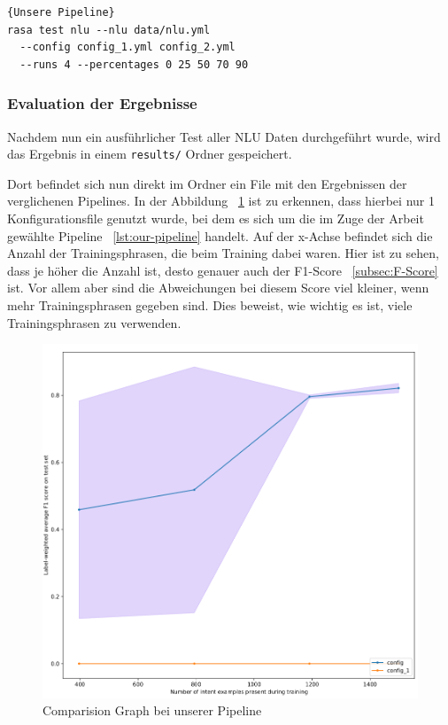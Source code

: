 \begin{lstlisting}[label={lst:comparing-pipelines-custom},caption={Unsere Pipeline}]{Unsere Pipeline}
rasa test nlu --nlu data/nlu.yml
  --config config_1.yml config_2.yml
  --runs 4 --percentages 0 25 50 70 90
\end{lstlisting}

\subsubsection{Evaluation der Ergebnisse}\label{subsubsec:evaluation-results}

Nachdem nun ein ausführlicher Test aller NLU Daten durchgeführt wurde, wird das Ergebnis in einem \texttt{results/} Ordner gespeichert.\cite{interpretingTheOutput}

Dort befindet sich nun direkt im Ordner ein File mit den Ergebnissen der verglichenen Pipelines.
In der Abbildung ~\ref{fig:comparision_graph} ist zu erkennen, dass hierbei nur 1 Konfigurationsfile genutzt wurde, bei dem es sich um die im Zuge der Arbeit gewählte Pipeline ~\ref{lst:our-pipeline} handelt.
Auf der x-Achse befindet sich die Anzahl der Trainingsphrasen, die beim Training dabei waren.
Hier ist zu sehen, dass je höher die Anzahl ist, desto genauer auch der F1-Score ~\ref{subsec:F-Score} ist.
Vor allem aber sind die Abweichungen bei diesem Score viel kleiner, wenn mehr Trainingsphrasen gegeben sind.
Dies beweist, wie wichtig es ist, viele Trainingsphrasen zu verwenden.

\begin{figure}[hbt!]
    \centering
    \includegraphics[scale=0.4]{pics/comparision_graph}
    \caption{Comparision Graph bei unserer Pipeline}
    \label{fig:comparision_graph}
\end{figure}

